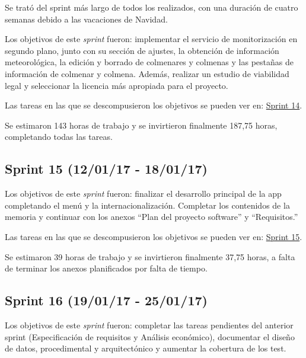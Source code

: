 Se trató del sprint más largo de todos los realizados, con una duración
de cuatro semanas debido a las vacaciones de Navidad.

Los objetivos de este \emph{sprint} fueron: implementar el servicio de
monitorización en segundo plano, junto con su sección de ajustes, la
obtención de información meteorológica, la edición y borrado de
colmenares y colmenas y las pestañas de información de colmenar y
colmena. Además, realizar un estudio de viabilidad legal y seleccionar
la licencia más apropiada para el proyecto.

Las tareas en las que se descompusieron los objetivos se pueden ver en:
\href{https://github.com/davidmigloz/go-bees/milestone/15?closed=1}{Sprint
14}.

Se estimaron 143 horas de trabajo y se invirtieron finalmente 187,75
horas, completando todas las tareas.


\subsection{Sprint 15 (12/01/17 -
18/01/17)}\label{sprint-15-120117---180117}

Los objetivos de este \emph{sprint} fueron: finalizar el desarrollo
principal de la app completando el menú y la internacionalización.
Completar los contenidos de la memoria y continuar con los anexos ``Plan
del proyecto software'' y ``Requisitos.''

Las tareas en las que se descompusieron los objetivos se pueden ver en:
\href{https://github.com/davidmigloz/go-bees/milestone/16?closed=1}{Sprint
15}.

Se estimaron 39 horas de trabajo y se invirtieron finalmente 37,75
horas, a falta de terminar los anexos planificados por falta de tiempo.


\subsection{Sprint 16 (19/01/17 -
25/01/17)}\label{sprint-16-190117---250117}

Los objetivos de este \emph{sprint} fueron: completar las tareas
pendientes del anterior sprint (Especificación de requisitos y Análisis
económico), documentar el diseño de datos, procedimental y
arquitectónico y aumentar la cobertura de los test.

